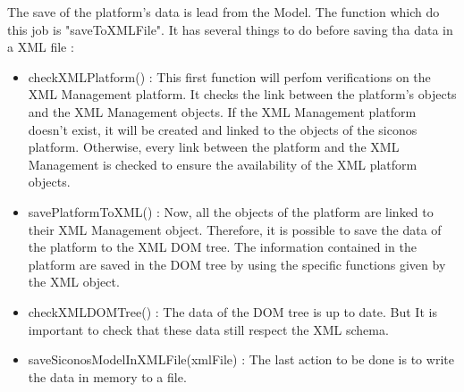 The save of the platform's data is lead from the Model. The function which do this job is
"saveToXMLFile". It has several things to do before saving tha data in a XML file :
\begin{itemize}
        \item checkXMLPlatform() : This first function will perfom verifications on the XML Management platform. It checks the
        link between the platform's objects and the XML Management objects. If the XML Management
        platform doesn't exist, it will be created and linked to the objects of the \ac{siconos}
        platform. Otherwise, every link between the platform and the XML Management is checked to ensure
        the availability of the XML platform objects.
        \item savePlatformToXML() : Now, all the objects of the platform are linked to their XML Management object. Therefore,
        it is possible to save the data of the platform to the XML DOM tree. The information
        contained in the platform are saved in the DOM tree by using the specific functions given
        by the XML object.
        \item checkXMLDOMTree() : The data of the DOM tree is up to date. But It is important to check that these data still
        respect the XML schema. 
        \item saveSiconosModelInXMLFile(xmlFile) : The last action to be done is to write the data in memory to a file.
\end{itemize}





